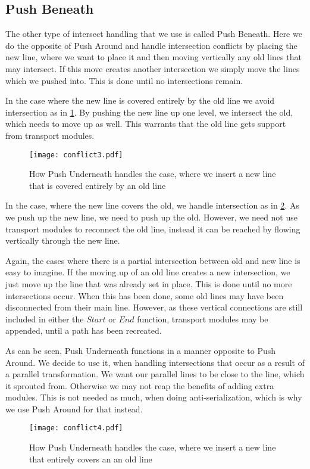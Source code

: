 \subsection{Push Beneath} \label{ssec:pbeneath}
The other type of intersect handling that we use is called Push Beneath. Here we do the opposite of Push Around and handle intersection conflicts by placing the new line, where we want to place it and then moving vertically any old lines that may intersect. If this move creates another intersection we simply move the lines which we pushed into. This is done until no intersections remain. 

In the case where the new line is covered entirely by the old line we avoid intersection as in \cref{fig:pushunderneath1}. By pushing the new line up one level, we intersect the old, which needs to move up as well. This warrants that the old line gets support from transport modules.

\begin{figure}[H]
\centering
\texttt{[image: conflict3.pdf]}
\caption{How Push Underneath handles the case, where we insert a new line that is covered entirely by an old line}
\label{fig:pushunderneath1}
\end{figure}

In the case, where the new line covers the old, we handle intersection as in \cref{fig:pushunderneath2}. As we push up the new line, we need to push up the old. However, we need not use transport modules to reconnect the old line, instead it can be reached by flowing vertically through the new line.

Again, the cases where there is a partial intersection between old and new line is easy to imagine. If the moving up of an old line creates a new intersection, we just move up the line that was already set in place. This is done until no more intersections occur. When this has been done, some old lines may have been disconnected from their main line. However, as these vertical connections are still included in either the $Start$ or $End$ function, transport modules may be appended, until a path has been recreated.  

As can be seen, Push Underneath functions in a manner opposite to Push Around. We decide to use it, when handling intersections that occur as a result of a parallel transformation. We want our parallel lines to be close to the line, which it sprouted from. Otherwise we may not reap the benefits of adding extra modules. This is not needed as much, when doing anti-serialization, which is why we use Push Around for that instead.

\begin{figure}[H]
\centering
\texttt{[image: conflict4.pdf]}
\caption{How Push Underneath handles the case, where we insert a new line that entirely covers an an old line}
\label{fig:pushunderneath2}
\end{figure}

